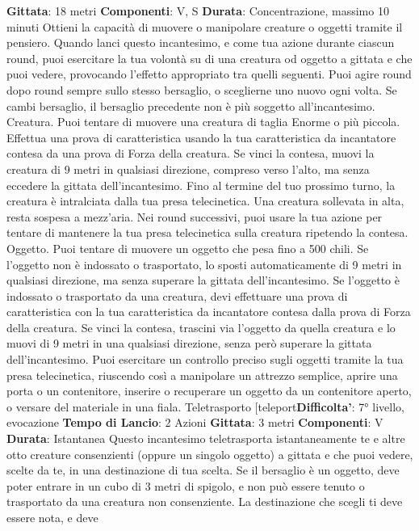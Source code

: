 \begin{multicols}{2}
\textbf{Gittata}: 18 metri
\textbf{Componenti}: V, S
\textbf{Durata}: Concentrazione, massimo 10 minuti
Ottieni la capacità di muovere o manipolare creature o
oggetti tramite il pensiero. Quando lanci questo
incantesimo, e come tua azione durante ciascun round,
puoi esercitare la tua volontà su di una creatura od
oggetto a gittata e che puoi vedere, provocando l’effetto
appropriato tra quelli seguenti. Puoi agire round dopo
round sempre sullo stesso bersaglio, o sceglierne uno
nuovo ogni volta. Se cambi bersaglio, il bersaglio
precedente non è più soggetto all’incantesimo.
Creatura. Puoi tentare di muovere una creatura di
taglia Enorme o più piccola. Effettua una prova di
caratteristica usando la tua caratteristica da incantatore
contesa da una prova di Forza della creatura. Se vinci
la contesa, muovi la creatura di 9 metri in qualsiasi
direzione, compreso verso l’alto, ma senza eccedere la
gittata dell’incantesimo. Fino al termine del tuo
prossimo turno, la creatura è intralciata dalla tua presa
telecinetica. Una creatura sollevata in alta, resta
sospesa a mezz’aria.
Nei round successivi, puoi usare la tua azione per
tentare di mantenere la tua presa telecinetica sulla
creatura ripetendo la contesa.
Oggetto. Puoi tentare di muovere un oggetto che pesa
fino a 500 chili. Se l’oggetto non è indossato o
trasportato, lo sposti automaticamente di 9 metri in
qualsiasi direzione, ma senza superare la gittata
dell’incantesimo.
Se l’oggetto è indossato o trasportato da una creatura,
devi effettuare una prova di caratteristica con la tua
caratteristica da incantatore contesa dalla prova di
Forza della creatura. Se vinci la contesa, trascini via
l’oggetto da quella creatura e lo muovi di 9 metri in una
qualsiasi direzione, senza però superare la gittata
dell’incantesimo.
Puoi esercitare un controllo preciso sugli oggetti tramite
la tua presa telecinetica, riuscendo così a manipolare
un attrezzo semplice, aprire una porta o un contenitore,
inserire o recuperare un oggetto da un contenitore
aperto, o versare del materiale in una fiala.
Teletrasporto
[teleport\textbf{Difficolta'}:
7° livello, evocazione
\textbf{Tempo di Lancio}: 2 Azioni
\textbf{Gittata}: 3 metri
\textbf{Componenti}: V
\textbf{Durata}: Istantanea
Questo incantesimo teletrasporta istantaneamente te e
altre otto creature consenzienti (oppure un singolo
oggetto) a gittata e che puoi vedere, scelte da te, in una
destinazione di tua scelta. Se il bersaglio è un oggetto,
deve poter entrare in un cubo di 3 metri di spigolo, e
non può essere tenuto o trasportato da una creatura
non consenziente.
La destinazione che scegli ti deve essere nota, e deve

\end{multicols}
